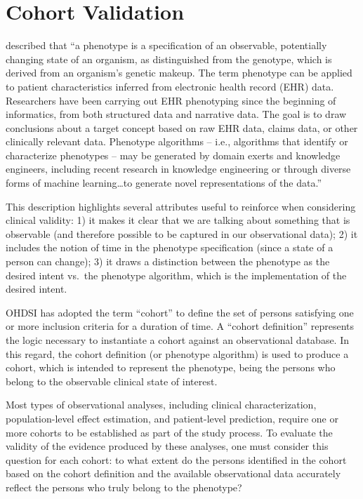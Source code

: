 \documentclass[11pt]{book}
\theoremstyle{definition}
\theoremstyle{definition}
\theoremstyle{definition}
\theoremstyle{remark}
\begin{document}
\section{Cohort Validation}\label{CohortValidation}

\citet{hripcsak_2017} described that ``a phenotype is a specification of
an observable, potentially changing state of an organism, as
distinguished from the genotype, which is derived from an organism's
genetic makeup. The term phenotype can be applied to patient
characteristics inferred from electronic health record (EHR) data.
Researchers have been carrying out EHR phenotyping since the beginning
of informatics, from both structured data and narrative data. The goal
is to draw conclusions about a target concept based on raw EHR data,
claims data, or other clinically relevant data. Phenotype algorithms --
i.e., algorithms that identify or characterize phenotypes -- may be
generated by domain exerts and knowledge engineers, including recent
research in knowledge engineering or through diverse forms of machine
learning\ldots{}to generate novel representations of the data.''

This description highlights several attributes useful to reinforce when
considering clinical validity: 1) it makes it clear that we are talking
about something that is observable (and therefore possible to be
captured in our observational data); 2) it includes the notion of time
in the phenotype specification (since a state of a person can change);
3) it draws a distinction between the phenotype as the desired intent
vs.~the phenotype algorithm, which is the implementation of the desired
intent.

OHDSI has adopted the term ``cohort'' to define the set of persons
satisfying one or more inclusion criteria for a duration of time. A
``cohort definition'' represents the logic necessary to instantiate a
cohort against an observational database. In this regard, the cohort
definition (or phenotype algorithm) is used to produce a cohort, which
is intended to represent the phenotype, being the persons who belong to
the observable clinical state of interest.

Most types of observational analyses, including clinical
characterization, population-level effect estimation, and patient-level
prediction, require one or more cohorts to be established as part of the
study process. To evaluate the validity of the evidence produced by
these analyses, one must consider this question for each cohort: to what
extent do the persons identified in the cohort based on the cohort
definition and the available observational data accurately reflect the
persons who truly belong to the phenotype?
\end{document}
